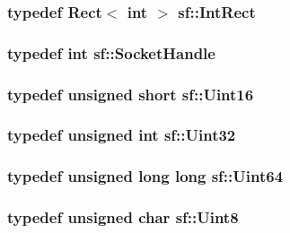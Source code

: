 \hypertarget{namespacesf_a1b1279ab06950b96686cffaacb72fed5}{
\subsubsection[{Int\-Rect}]{\setlength{\rightskip}{0pt plus 5cm}typedef {\bf Rect}$<$ {\bf int} $>$ {\bf sf\-::\-Int\-Rect}}}\label{namespacesf_a1b1279ab06950b96686cffaacb72fed5}
\hypertarget{namespacesf_aefabb521d8f5eec9e6a9b521271d20d1}{
\subsubsection[{Socket\-Handle}]{\setlength{\rightskip}{0pt plus 5cm}typedef {\bf int} {\bf sf\-::\-Socket\-Handle}}}\label{namespacesf_aefabb521d8f5eec9e6a9b521271d20d1}
\hypertarget{namespacesf_a2fcaf787248b0b83dfb6b145ca348246}{
\subsubsection[{Uint16}]{\setlength{\rightskip}{0pt plus 5cm}typedef {\bf unsigned} short {\bf sf\-::\-Uint16}}}\label{namespacesf_a2fcaf787248b0b83dfb6b145ca348246}
\hypertarget{namespacesf_aa746fb1ddef4410bddf198ebb27e727c}{
\subsubsection[{Uint32}]{\setlength{\rightskip}{0pt plus 5cm}typedef {\bf unsigned} {\bf int} {\bf sf\-::\-Uint32}}}\label{namespacesf_aa746fb1ddef4410bddf198ebb27e727c}
\hypertarget{namespacesf_add9ac83466d96b9f50a009b9f4064266}{
\subsubsection[{Uint64}]{\setlength{\rightskip}{0pt plus 5cm}typedef {\bf unsigned} long long {\bf sf\-::\-Uint64}}}\label{namespacesf_add9ac83466d96b9f50a009b9f4064266}
\hypertarget{namespacesf_a4ef3d630785c4f296f9b4f274c33d78e}{
\subsubsection[{Uint8}]{\setlength{\rightskip}{0pt plus 5cm}typedef {\bf unsigned} char {\bf sf\-::\-Uint8}}}\label{namespacesf_a4ef3d630785c4f296f9b4f274c33d78e}
